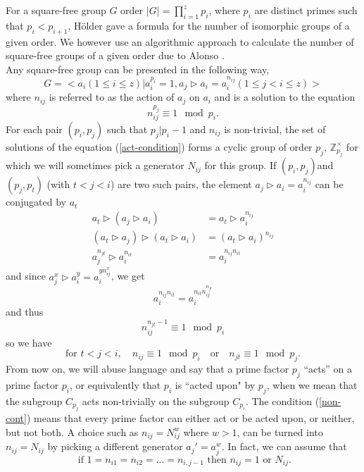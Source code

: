 \documentclass[a4paper, 10pt]{book}
\theoremstyle{definition}
\numberwithin{equation}{chapter}
\newcommand\hit{\triangleright}
\newcommand\ZZ{\mathbb Z}
\begin{document}
For a square-free group $G$ order $|G| = \prod_{i=1}^z p_i$, where $p_i$ are distinct primes such that $p_i <p_{i+1}$, H\"older gave a formula for the number of isomorphic groups of a given order. We however use an algorithmic approach to calculate the number of square-free groups of a given order due to Alonso \cite{MR506898}.\\ 
Any square-free group can be presented in the following way,  
\begin{equation}\label{presentation}
	G= <a_i (1\leq i\leq z)| a_i^{p_i} =1, a_j\hit a_i = a_i^{n_{ij}} (1\leq j<i\leq z)>
\end{equation}
where $n_{ij}$ is referred to as the action of $a_j$ on $a_i$ and is a solution to the equation \begin{equation}\label{act-condition}
	n_{ij}^{p_j}\equiv 1 \mod p_i.
\end{equation} For each pair $(p_i, p_j)$ such that $p_j|p_i-1$ and $n_{ij}$ is non-trivial, the set of solutions of the equation (\ref{act-condition}) forms a cyclic group of order $p_j$, $\ZZ_{p_j}^\times$ for which we will sometimes pick a generator $N_{ij}$ for this group.
If $(p_i, p_j) $and $(p_j, p_t)$ (with $t<j<i$) are two such pairs, the element $a_j\hit a_i = a_i^{n_{ij}}$ can be conjugated by $a_t$ \begin{align*}
a_t\hit(a_j\hit a_i) &= a_t\hit a_i^{n_{ij}}\\
	(a_t\hit a_j)\hit(a_t\hit a_i) &= (a_t\hit a_i)^{n_{ij}}\\
	a_j^{n_{jt}}\hit a_i^{n_{it}} &= a_i^{n_{ij}n_{it}}
\end{align*}
and since $a_j^x\hit a_i^y = a_i^{yn_{ij}^x}$, we get\begin{equation*}
	a_i^{n_{ij}n_{it}} = a_i^{n_{it}n_{ij}^{n_{jt}}} \end{equation*} 
and thus
\begin{equation*}
	n_{ij}^{n_{jt} -1} \equiv 1 \mod p_i
\end{equation*}
so we have \begin{equation}\label{non-cont}
	\text{for } t<j<i, \quad n_{ij} \equiv 1 \mod p_i \quad \text{or}\quad n_{jt} \equiv 1 \mod p_j.
\end{equation} From now on, we will abuse language and say that a prime factor $p_j$ ``acts'' on a prime factor $p_i$, or equivalently that $p_i$ is ``acted upon" by $p_j$, when we mean that the subgroup $C_{p_j}$ acts non-trivially on the subgroup $C_{p_i}$. The condition (\ref{non-cont}) means that every prime factor can either act or be acted upon, or neither, but not both. A choice such as $n_{ij} =N_{ij}^w$ where  $w>1$, can be turned into $n_{ij} =N_{ij}$ by picking a different generator $a_j'= a_j^w$. In fact, we can assume that \begin{equation}\label{possible}
	\text{ if $1 = n_{i1} =n_{i2} =\dots =n_{i, j-1}$  then $n_{ij}= 1$ or $N_{ij}$.}
\end{equation} 
\end{document}
